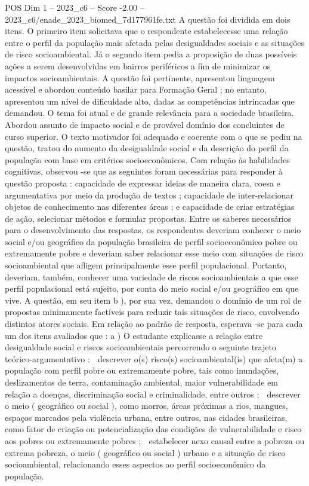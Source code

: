 \begin{textsample}{POS Dim 1 – 2023\_c6 – Score -2.00 – 2023\_c6/enade\_2023\_biomed\_7d177961fe.txt}
A questão foi dividida em dois itens.
O primeiro item solicitava que o respondente estabelecesse uma relação entre o perfil da população mais afetada pelas desigualdades sociais e as situações de risco socioambiental.
Já o segundo item pedia a proposição de duas possíveis ações a serem desenvolvidas em bairros periféricos a fim de minimizar os impactos socioambientais.
A questão foi pertinente, apresentou linguagem acessível e abordou conteúdo basilar para Formação Geral ; no entanto, apresentou um nível de dificuldade alto, dadas as competências intrincadas que demandou.
O tema foi atual e de grande relevância para a sociedade brasileira.
Abordou assunto de impacto social e de provável domínio dos concluintes de curso superior.
O texto motivador foi adequado e coerente com o que se pediu na questão, tratou do aumento da desigualdade social e da descrição do perfil da população com base em critérios socioeconômicos.
Com relação às habilidades cognitivas, observou -se que as seguintes foram necessárias para responder à questão proposta : capacidade de expressar ideias de maneira clara, coesa e argumentativa por meio da produção de textos ; capacidade de inter-relacionar objetos de conhecimento nas diferentes áreas ; e capacidade de criar estratégias de ação, selecionar métodos e formular propostas.
Entre os saberes necessários para o desenvolvimento das respostas, os respondentes deveriam conhecer o meio social e/ou geográfico da população brasileira de perfil socioeconômico pobre ou extremamente pobre e deveriam saber relacionar esse meio com situações de risco socioambiental que afligem principalmente esse perfil populacional.
Portanto, deveriam, também, conhecer uma variedade de riscos socioambientais a que esse perfil populacional está sujeito, por conta do meio social e/ou geográfico em que vive.
A questão, em seu item b ), por sua vez, demandou o domínio de um rol de propostas minimamente factíveis para reduzir tais situações de risco, envolvendo distintos atores sociais.
Em relação ao padrão de resposta, esperava -se para cada um dos itens avaliados que : a ) O estudante explicasse a relação entre desigualdade social e riscos socioambientais percorrendo o seguinte trajeto teórico-argumentativo :  descrever o(s) risco(s) socioambiental(is) que afeta(m) a população com perfil pobre ou extremamente pobre, tais como inundações, deslizamentos de terra, contaminação ambiental, maior vulnerabilidade em relação a doenças, discriminação social e criminalidade, entre outros ;  descrever o meio ( geográfico ou social ), como morros, áreas próximas a rios, mangues, espaços marcados pela violência urbana, entre outros, nas cidades brasileiras, como fator de criação ou potencialização das condições de vulnerabilidade e risco aos pobres ou extremamente pobres ;  estabelecer nexo causal entre a pobreza ou extrema pobreza, o meio ( geográfico ou social ) urbano e a situação de risco socioambiental, relacionando esses aspectos ao perfil socioeconômico da população.

\end{textsample}
